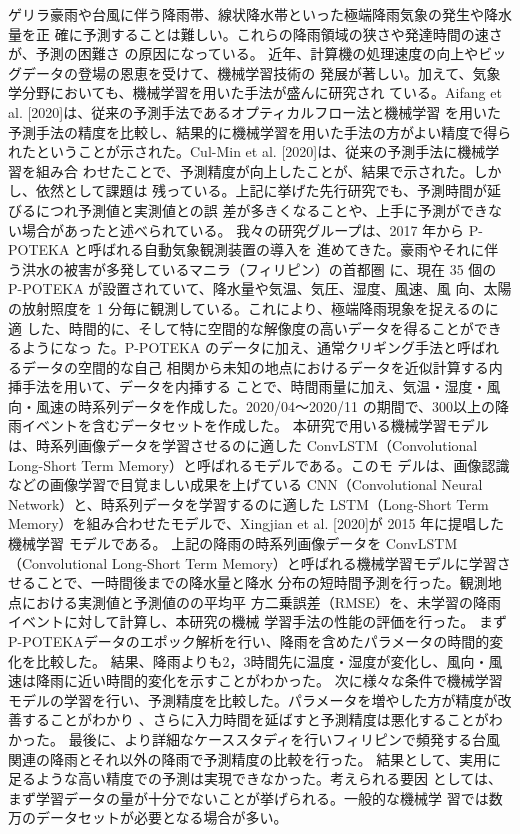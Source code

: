 ゲリラ豪雨や台風に伴う降雨帯、線状降水帯といった極端降雨気象の発生や降水量を正
確に予測することは難しい。これらの降雨領域の狭さや発達時間の速さが、予測の困難さ
の原因になっている。
近年、計算機の処理速度の向上やビッグデータの登場の恩恵を受けて、機械学習技術の
発展が著しい。加えて、気象学分野においても、機械学習を用いた手法が盛んに研究され
ている。Aifang et al. [2020]は、従来の予測手法であるオプティカルフロー法と機械学習
を用いた予測手法の精度を比較し、結果的に機械学習を用いた手法の方がよい精度で得ら
れたということが示された。Cul-Min et al. [2020]は、従来の予測手法に機械学習を組み合
わせたことで、予測精度が向上したことが、結果で示された。しかし、依然として課題は
残っている。上記に挙げた先行研究でも、予測時間が延びるにつれ予測値と実測値との誤
差が多きくなることや、上手に予測ができない場合があったと述べられている。
我々の研究グループは、2017 年から P-POTEKA と呼ばれる自動気象観測装置の導入を
進めてきた。豪雨やそれに伴う洪水の被害が多発しているマニラ（フィリピン）の首都圏
に、現在 35 個の P-POTEKA が設置されていて、降水量や気温、気圧、湿度、風速、風
向、太陽の放射照度を 1 分毎に観測している。これにより、極端降雨現象を捉えるのに適
した、時間的に、そして特に空間的な解像度の高いデータを得ることができるようになっ
た。P-POTEKA のデータに加え、通常クリギング手法と呼ばれるデータの空間的な自己
相関から未知の地点におけるデータを近似計算する内挿手法を用いて、データを内挿する
ことで、時間雨量に加え、気温・湿度・風向・風速の時系列データを作成した。2020/04～2020/11 の期間で、300以上の降雨イベントを含むデータセットを作成した。
本研究で用いる機械学習モデルは、時系列画像データを学習させるのに適した
ConvLSTM（Convolutional Long-Short Term Memory）と呼ばれるモデルである。このモ
デルは、画像認識などの画像学習で目覚ましい成果を上げている CNN（Convolutional
Neural Network）と、時系列データを学習するのに適した LSTM（Long-Short Term
Memory）を組み合わせたモデルで、Xingjian et al. [2020]が 2015 年に提唱した機械学習
モデルである。
上記の降雨の時系列画像データを ConvLSTM（Convolutional Long-Short Term
Memory）と呼ばれる機械学習モデルに学習させることで、一時間後までの降水量と降水
分布の短時間予測を行った。観測地点における実測値と予測値のの平均平
方二乗誤差（RMSE）を、未学習の降雨イベントに対して計算し、本研究の機械
学習手法の性能の評価を行った。
まずP-POTEKAデータのエポック解析を行い、降雨を含めたパラメータの時間的変化を比較した。
結果、降雨よりも2，3時間先に温度・湿度が変化し、風向・風速は降雨に近い時間的変化を示すことがわかった。
次に様々な条件で機械学習モデルの学習を行い、予測精度を比較した。パラメータを増やした方が精度が改善することがわかり
、さらに入力時間を延ばすと予測精度は悪化することがわかった。
最後に、より詳細なケーススタディを行いフィリピンで頻発する台風関連の降雨とそれ以外の降雨で予測精度の比較を行った。
結果として、実用に足るような高い精度での予測は実現できなかった。考えられる要因
としては、まず学習データの量が十分でないことが挙げられる。一般的な機械学
習では数万のデータセットが必要となる場合が多い。
